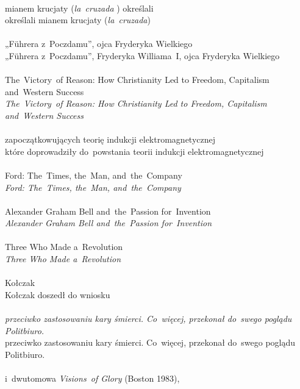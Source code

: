 \documentclass[a4paper,11pt]{article}
\begin{document}
\noindent
{} \\
\Jest  mianem krucjaty (\textit{la~cruzada} ) określali \\
\Powin określali mianem krucjaty (\textit{la~cruzada}) \\
 \\
\Jest  „F\"{u}hrera z~Poczdamu”, ojca Fryderyka Wielkiego \\
\Powin „F\"{u}hrera z~Poczdamu”, Fryderyka Williama~I, ojca Fryderyka
Wielkiego \\
 \\
\Jest  The~Victory~of Reason: How Christianity Led to Freedom,
Capitalism and~Western Success \\
\Powin \textit{The~Victory~of Reason: How Christianity Led to Freedom,
  Capitalism and~Western Success} \\
 \\
\Jest  zapoczątkowujących teorię indukcji elektromagnetycznej \\
\Powin które doprowadziły do~powstania teorii indukcji
elektromagnetycznej \\
 \\
\Jest  Ford: The~Times, the~Man, and~the~Company \\
\Powin \textit{Ford: The~Times, the~Man, and~the~Company} \\
 \\
\Jest  Alexander Graham Bell and~the~Passion for~Invention \\
\Powin \textit{Alexander Graham Bell and~the~Passion for~Invention} \\
 \\
\Jest  Three Who Made a~Revolution \\
\Powin \textit{Three Who Made a~Revolution} \\
 \\
\Jest  Kołczak \\
\Powin Kołczak doszedł do wniosku \\
 \\
\Jest \textit{przeciwko zastosowaniu kary śmierci. Co~więcej,
  przekonał do~swego poglądu Politbiuro.} \\
\Powin przeciwko zastosowaniu kary śmierci. Co~więcej, przekonał
do~swego poglądu Politbiuro. \\
 \\
\Jest  i~dwutomowa \textit{Visions~of Glory} (Boston 1983),
\end{document}
